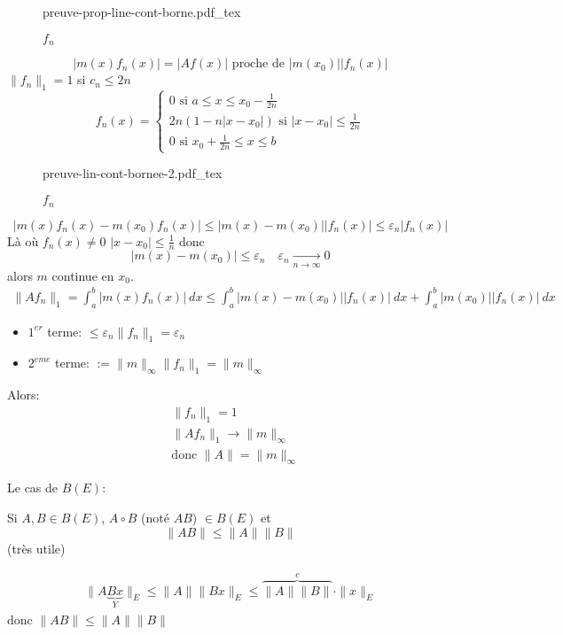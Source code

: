 \documentclass[a4paper]{report}
\theoremstyle{definition}
\newcommand{\incfig}[1]{%
    \def\svgwidth{\columnwidth}
    {#1.pdf_tex}
}
\begin{document}
\begin{preuve}
\begin{figure}[H]
    \centering
    \incfig{preuve-prop-line-cont-borne}
    \caption{$f_n$}
    \label{fig:preuve-prop-line-cont-borne}
\end{figure}
\[
|m(x)f_n(x)| = |Af(x)| \text{ proche de } |m(x_0)| |f_n(x)|
\] 
$\|f_n\|_{1} = 1$ si $c_n \le 2n$
\[
f_n(x) = \begin{cases}
    0 \text{ si } a \le x \le x_0 - \frac{1}{2n}\\
    2n(1 - n|x - x_0|) \text{ si } |x - x_0| \le \frac{1}{2n}\\
    0 \text{ si } x_0 + \frac{1}{2n} \le x \le b
\end{cases}
\] 
\begin{figure}[H]
    \centering
    \incfig{preuve-lin-cont-bornee-2}
    \caption{$f_n$}
    \label{fig:preuve-lin-cont-bornee-2}
\end{figure}
\[
|m(x)f_n(x) - m(x_0)f_n(x)| \le |m(x) - m(x_0)| |f_n(x)| \le \varepsilon_n|f_n(x)|
\] 
Là où $f_n(x) \neq 0$ $|x - x_0| \le \frac{1}{n}$ donc 
\[
|m(x) - m(x_0)| \le \varepsilon_n \quad \varepsilon_n \xrightarrow[n \to \infty]{} 0
\] 
alors $m$ continue en  $x_0$.
 \begin{align*}
    \|Af_n\|_{1} = \int_{{a}}^{{b}} {|m(x)f_n(x)|} \: d{x} \le \int_{{a}}^{{b}} {|m(x) - m(x_0)| |f_n(x)|} \: d{x} + \int_{{a}}^{{b}} {|m(x_0)| |f_n(x)|} \: d{x} 
\end{align*}
\begin{itemize}
    \item $1^{er}$ terme: $\le \varepsilon_n\|f_n\|_{1} = \varepsilon_n$
    \item $2^{eme}$ terme: $:= \|m\|_{\infty}\|f_n\|_{1} = \|m\|_{\infty}$
\end{itemize}
Alors:
\begin{align*}
    &\|f_n\|_{1} = 1\\
    &\|Af_n\|_{1} \to \|m\|_{\infty}\\
    &\text{donc } \|A\| = \|m\|_{\infty}
\end{align*}
\end{preuve}
\begin{prop}
   Le cas de $B(E)$:
   \par
   Si $A, B \in B(E)$, $A \circ B$ (noté $AB$) $\in B(E)$ et 
   \[
   \|AB\| \le \|A\|\|B\|
   \] 
   (très utile)
\end{prop}
\begin{preuve}
   \begin{align*}
       \|A\underbrace{Bx}_{Y}\|_{E} \le \|A\|\|Bx\|_{E} \le \overbrace{\|A\|\|B\|}^{c} \cdot \|x\|_{E}
   \end{align*} 
    donc $\|AB\| \le \|A\| \|B\|$
\end{preuve}
\end{document}

